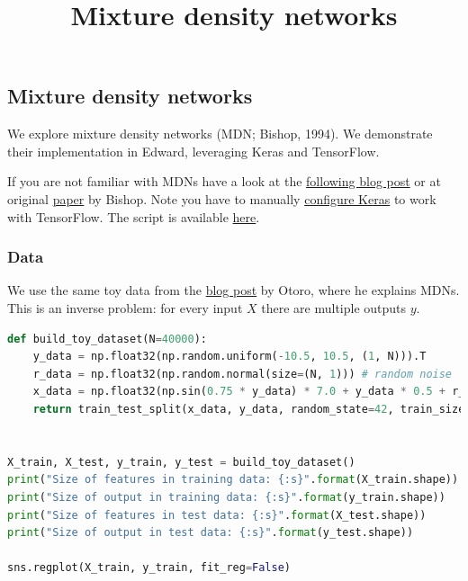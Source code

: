 \title{Mixture density networks}

\subsection{Mixture density networks}

We explore mixture density networks (MDN; Bishop, 1994). We
demonstrate their implementation in Edward, leveraging Keras and
TensorFlow.

If you are not familiar with MDNs have a look at the
\href{http://cbonnett.github.io/MDN.html}{following blog post} or at
original
\href{http://research.microsoft.com/en-us/um/people/cmbishop/downloads/Bishop-NCRG-94-004.pdf}{paper}
by Bishop.
Note you have to manually \href{https://keras.io/backend/}
{configure Keras} to work with TensorFlow.
The script is available
\href{https://github.com/blei-lab/edward/blob/master/examples/mixture_density_network_demo.py}
{here}.

\subsubsection{Data}

We use the same toy data from the \href{http://blog.otoro.net/2015/11/24/mixture-density-networks-with-tensorflow/}{blog post} by Otoro, where he explains MDNs. This is an inverse problem: for every input $X$ there are multiple outputs $y$.

\begin{lstlisting}[language=Python]
def build_toy_dataset(N=40000):
    y_data = np.float32(np.random.uniform(-10.5, 10.5, (1, N))).T
    r_data = np.float32(np.random.normal(size=(N, 1))) # random noise
    x_data = np.float32(np.sin(0.75 * y_data) * 7.0 + y_data * 0.5 + r_data * 1.0)
    return train_test_split(x_data, y_data, random_state=42, train_size=0.1)


X_train, X_test, y_train, y_test = build_toy_dataset()
print("Size of features in training data: {:s}".format(X_train.shape))
print("Size of output in training data: {:s}".format(y_train.shape))
print("Size of features in test data: {:s}".format(X_test.shape))
print("Size of output in test data: {:s}".format(y_test.shape))

sns.regplot(X_train, y_train, fit_reg=False)
\end{lstlisting}

